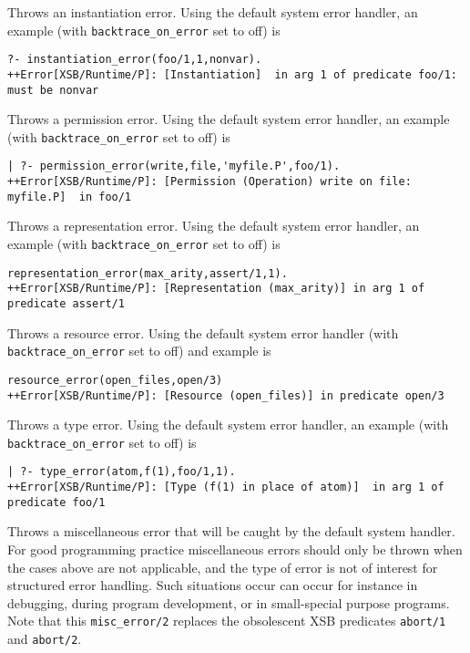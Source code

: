 \begin{description}
{\begin{verbatim}
\end{verbatim}
}
%
%
Throws an instantiation error.  Using the default system error
handler, an example (with {\tt backtrace\_on\_error} set to off) is 
{\small 
\begin{verbatim}
?- instantiation_error(foo/1,1,nonvar).
++Error[XSB/Runtime/P]: [Instantiation]  in arg 1 of predicate foo/1: must be nonvar
\end{verbatim}
}
%
%
Throws a permission error.  Using the default system error
handler, an example (with {\tt backtrace\_on\_error} set to off) is 
{\small 
\begin{verbatim}
| ?- permission_error(write,file,'myfile.P',foo/1).
++Error[XSB/Runtime/P]: [Permission (Operation) write on file: myfile.P]  in foo/1
\end{verbatim}
}
%
% 
Throws a representation error.  Using the default system error handler, an
example (with {\tt backtrace\_on\_error} set to off) is {\small
\begin{verbatim}
representation_error(max_arity,assert/1,1).
++Error[XSB/Runtime/P]: [Representation (max_arity)] in arg 1 of predicate assert/1
\end{verbatim} }
%
%
Throws a resource error.  Using the default system error handler
(with {\tt backtrace\_on\_error} set to off) and example is {\small
\begin{verbatim}
resource_error(open_files,open/3)
++Error[XSB/Runtime/P]: [Resource (open_files)] in predicate open/3
\end{verbatim} }
%
%
Throws a type error.  Using the default system error
handler, an example (with {\tt backtrace\_on\_error} set to off) is 
{\small 
\begin{verbatim}
| ?- type_error(atom,f(1),foo/1,1).
++Error[XSB/Runtime/P]: [Type (f(1) in place of atom)]  in arg 1 of predicate foo/1
\end{verbatim}
}
%
%
Throws a miscellaneous error that will
be caught by the default system handler.  For good programming
practice miscellaneous errors should only be thrown when the cases
above are not applicable, and the type of error is not of interest for
structured error handling.  Such situations occur can occur for
instance in debugging, during program development, or in small-special
purpose programs.  Note that this {\tt misc\_error/2} replaces the
obsolescent XSB predicates {\tt abort/1} and {\tt abort/2}.
%
\end{description}
